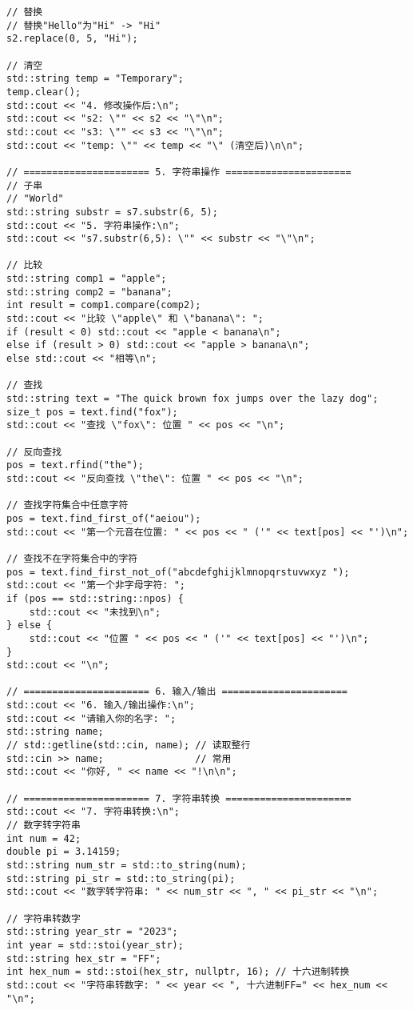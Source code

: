 \begin{lstlisting}
// 替换
// 替换"Hello"为"Hi" -> "Hi"
s2.replace(0, 5, "Hi");

// 清空
std::string temp = "Temporary";
temp.clear();
std::cout << "4. 修改操作后:\n";
std::cout << "s2: \"" << s2 << "\"\n";
std::cout << "s3: \"" << s3 << "\"\n";
std::cout << "temp: \"" << temp << "\" (清空后)\n\n";

// ====================== 5. 字符串操作 ======================
// 子串
// "World"
std::string substr = s7.substr(6, 5);
std::cout << "5. 字符串操作:\n";
std::cout << "s7.substr(6,5): \"" << substr << "\"\n";

// 比较
std::string comp1 = "apple";
std::string comp2 = "banana";
int result = comp1.compare(comp2);
std::cout << "比较 \"apple\" 和 \"banana\": ";
if (result < 0) std::cout << "apple < banana\n";
else if (result > 0) std::cout << "apple > banana\n";
else std::cout << "相等\n";

// 查找
std::string text = "The quick brown fox jumps over the lazy dog";
size_t pos = text.find("fox");
std::cout << "查找 \"fox\": 位置 " << pos << "\n";

// 反向查找
pos = text.rfind("the");
std::cout << "反向查找 \"the\": 位置 " << pos << "\n";

// 查找字符集合中任意字符
pos = text.find_first_of("aeiou");
std::cout << "第一个元音在位置: " << pos << " ('" << text[pos] << "')\n";

// 查找不在字符集合中的字符
pos = text.find_first_not_of("abcdefghijklmnopqrstuvwxyz ");
std::cout << "第一个非字母字符: ";
if (pos == std::string::npos) {
    std::cout << "未找到\n";
} else {
    std::cout << "位置 " << pos << " ('" << text[pos] << "')\n";
}
std::cout << "\n";

// ====================== 6. 输入/输出 ======================
std::cout << "6. 输入/输出操作:\n";
std::cout << "请输入你的名字: ";
std::string name;
// std::getline(std::cin, name); // 读取整行
std::cin >> name;                // 常用
std::cout << "你好, " << name << "!\n\n";

// ====================== 7. 字符串转换 ======================
std::cout << "7. 字符串转换:\n";
// 数字转字符串
int num = 42;
double pi = 3.14159;
std::string num_str = std::to_string(num);
std::string pi_str = std::to_string(pi);
std::cout << "数字转字符串: " << num_str << ", " << pi_str << "\n";

// 字符串转数字
std::string year_str = "2023";
int year = std::stoi(year_str);
std::string hex_str = "FF";
int hex_num = std::stoi(hex_str, nullptr, 16); // 十六进制转换
std::cout << "字符串转数字: " << year << ", 十六进制FF=" << hex_num << "\n";


\end{lstlisting}
